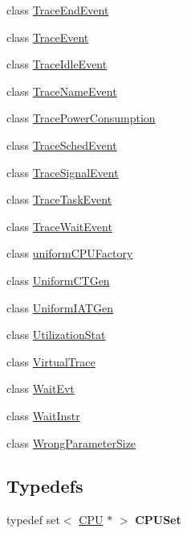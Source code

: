 \begin{DoxyCompactItemize}
\item 
class \hyperlink{classRTSim_1_1TraceEndEvent}{Trace\+End\+Event}
\item 
class \hyperlink{classRTSim_1_1TraceEvent}{Trace\+Event}
\item 
class \hyperlink{classRTSim_1_1TraceIdleEvent}{Trace\+Idle\+Event}
\item 
class \hyperlink{classRTSim_1_1TraceNameEvent}{Trace\+Name\+Event}
\item 
class \hyperlink{classRTSim_1_1TracePowerConsumption}{Trace\+Power\+Consumption}
\item 
class \hyperlink{classRTSim_1_1TraceSchedEvent}{Trace\+Sched\+Event}
\item 
class \hyperlink{classRTSim_1_1TraceSignalEvent}{Trace\+Signal\+Event}
\item 
class \hyperlink{classRTSim_1_1TraceTaskEvent}{Trace\+Task\+Event}
\item 
class \hyperlink{classRTSim_1_1TraceWaitEvent}{Trace\+Wait\+Event}
\item 
class \hyperlink{classRTSim_1_1uniformCPUFactory}{uniform\+C\+P\+U\+Factory}
\item 
class \hyperlink{classRTSim_1_1UniformCTGen}{Uniform\+C\+T\+Gen}
\item 
class \hyperlink{classRTSim_1_1UniformIATGen}{Uniform\+I\+A\+T\+Gen}
\item 
class \hyperlink{classRTSim_1_1UtilizationStat}{Utilization\+Stat}
\item 
class \hyperlink{classRTSim_1_1VirtualTrace}{Virtual\+Trace}
\item 
class \hyperlink{classRTSim_1_1WaitEvt}{Wait\+Evt}
\item 
class \hyperlink{classRTSim_1_1WaitInstr}{Wait\+Instr}
\item 
class \hyperlink{classRTSim_1_1WrongParameterSize}{Wrong\+Parameter\+Size}
\end{DoxyCompactItemize}
\subsection*{Typedefs}
\begin{DoxyCompactItemize}
\item 
typedef set$<$ \hyperlink{classRTSim_1_1CPU}{C\+PU} $\ast$ $>$ {\bfseries C\+P\+U\+Set}\hypertarget{namespaceRTSim_a5cfedd2fcda4392662e0b5efd5d05e74}{}\label{namespaceRTSim_a5cfedd2fcda4392662e0b5efd5d05e74}

\end{DoxyCompactItemize}
